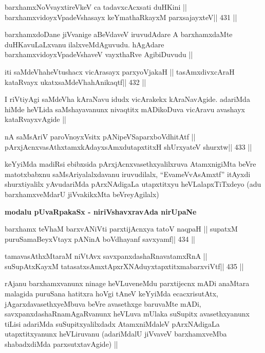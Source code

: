 \begin{shl}
barxhamxNoV\s vayxtireVkeV ca tadavxcAcxsati duHKini ||
barxhamxvidoyxVpadeVshasayx keYmathaRkayxM parxsajayxteV\hfill || 431 ||
\end{shl}

\begin{artha}
barxhamxdoDane jiVvanige aBeVdaveV iruvudAdare A barxhamxdaMte
duHKavuLaLxvanu ilalxveMdAguvudu. hAgAdare barxhamxvidoyxVpadeVshaveV
vayxthaRve AgibiDuvudu ||
\end{artha}

\begin{shl}
iti saMdeVhaheVtushacx vicArasayx parxyoVjakaH ||
tasAmxdivxcAraH kataRvayx ukatxsaMdeVhahAnikaqtf\hfill || 432 ||
\end{shl}

\begin{artha}
I riVtiyAgi saMdeVha kAraNavu idudx vicArakekx kAraNavAgide. adariMda
hiMde heVLida saMshayavanunx nivaqtitx mADikoDuva vicAravu
avashayx kataRvayxvAgide ||
\end{artha}

\begin{shl}
nA saMsAriV paroV\s noyxV\s sitx pANipeVSaparxboVdhitAtf ||
pArxjAcnxvasAthxtamxkAdayxsAmxdutapxtitxH shUrxyateV shurxtw\hfill || 433 ||
\end{shl}

\begin{artha}
keYyiMda madiRsi ebibxsida pArxjAcnxvasethxyalilxruva AtamxnigiMta
beVre matotxbabxnu saMsAriyalalxdavanu iruvudilalx, ``EvameVvAsAmxtf''
itAyxdi shurxtiyalilx yAvudariMda pArxNAdigaLa utapxtitxyu
heVLalapxTiTxdeyo (adu barxhamxveMdarU jiVvakikxMta beVreyAgilalx)
\end{artha}

\medskip
\centerline{\Large{\textbf{modalu pUvaRpakaSx - niriVshavxravAda nirUpaNe}}}

\medskip

\begin{shl}
barxhamx teV\s haM barxvANiVti parxtijAcnxya tatoV naqpaH ||
supatxM puruSamaBeyxVtayx pANinA boVdhayanf savxyamf\hfill || 434 ||
\end{shl}

\begin{shl}
tamavasAthxMtaraM niVtAvx savxpanxdashaRnavatamxRnA ||
suSupAtxKayxM tatasatxsAmxtApxrXNAduyxtapxtitxmabarxviVtf\hfill || 435 ||
\end{shl}

\begin{artha}
rAjanu barxhamxvanunx ninage heVLuveneMdu parxtijecnx mADi anaMtara
malagida puruSana hatitxra hoVgi tAneV keYyiMda ecacxrisutAtx,
jAgarxdavasethxyeMbuva beVre avasethxge baruvaMte mADi,
savxpanxdashaRnamAgaRvanunx heVLuva mUlaka suSupitx avasethxyanunx
tiLisi adariMda suSupitxyalilxdadx AtamxniMdaleV pArxNAdigaLa
utapxtitxyanunx heVLiruvanu (adariMdalU jiVvaveV barxhamxveMba
shabadxdiMda parxsutxtavAgide) ||
\end{artha}

